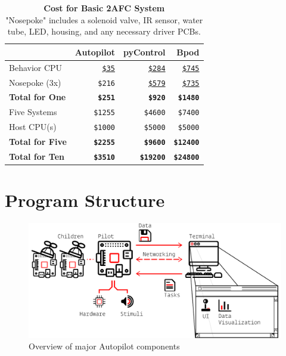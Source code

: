 \begin{table}
\caption{\textbf{Cost for Basic 2AFC System}\\
\noindent"Nosepoke" includes a solenoid valve, IR sensor, water tube, LED, housing, and any necessary driver PCBs.}
\label{tab:cost}
\noindent\begin{tabularx}{\linewidth}{XRRR}\toprule
& Autopilot & pyControl & Bpod  \\
\midrule
Behavior CPU & \href{https://www.adafruit.com/product/3775?src=raspberrypi}{\texttt{\$35}} & \href{http://www.open-ephys.org/store/pycontrol}{\texttt{\$284}} & \href{https://sanworks.io/shop/viewproduct?productID=1024}{\texttt{\$745}}\\
Nosepoke (3x) & \texttt{\$216} & \href{http://www.open-ephys.org/store/pycontrol-peripherals}{\texttt{\$579}} & \href{https://sanworks.io/shop/viewproduct?productID=1009}{\texttt{\$735}} \\
\textbf{Total for One} & \textbf{\texttt{\$251}} & \textbf{\texttt{\$920}} & \textbf{\texttt{\$1480}}\\
\midrule
Five Systems & \texttt{\$1255} & \texttt{\$4600} & \texttt{\$7400} \\
Host CPU(s) & \texttt{\$1000} & \texttt{\$5000} & \texttt{\$5000} \\
\textbf{Total for Five} & \textbf{\texttt{\$2255}} & \textbf{\texttt{\$9600}} & \textbf{\texttt{\$12400}} \\
\midrule
\textbf{Total for Ten} & \textbf{\texttt{\$3510}} & \textbf{\texttt{\$19200}} & \textbf{\texttt{\$24800}} \\
\bottomrule
\end{tabularx}
\end{table}

\chapter{Program Structure}
\label{sec:structure}

\begin{figure}
\includegraphics[]{figures/whole_system_black.pdf}
\caption{Overview of major Autopilot components}
\end{figure}

